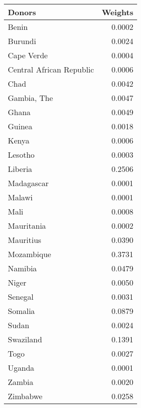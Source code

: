 \begin{tabular}{lr}
\toprule
                  Donors &  Weights \\
\midrule
                   Benin &   0.0002 \\
                 Burundi &   0.0024 \\
              Cape Verde &   0.0004 \\
Central African Republic &   0.0006 \\
                    Chad &   0.0042 \\
             Gambia, The &   0.0047 \\
                   Ghana &   0.0049 \\
                  Guinea &   0.0018 \\
                   Kenya &   0.0006 \\
                 Lesotho &   0.0003 \\
                 Liberia &   0.2506 \\
              Madagascar &   0.0001 \\
                  Malawi &   0.0001 \\
                    Mali &   0.0008 \\
              Mauritania &   0.0002 \\
               Mauritius &   0.0390 \\
              Mozambique &   0.3731 \\
                 Namibia &   0.0479 \\
                   Niger &   0.0050 \\
                 Senegal &   0.0031 \\
                 Somalia &   0.0879 \\
                   Sudan &   0.0024 \\
               Swaziland &   0.1391 \\
                    Togo &   0.0027 \\
                  Uganda &   0.0001 \\
                  Zambia &   0.0020 \\
                Zimbabwe &   0.0258 \\
\bottomrule
\end{tabular}
